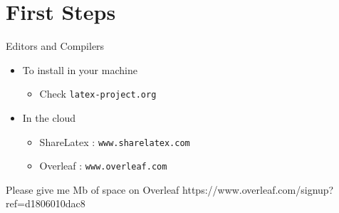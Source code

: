 






\section{First Steps}
	
\begin{frame}{Editors and Compilers}
\begin{itemize}
\item To install in your machine
\begin{itemize}
\item Check \texttt{latex-project.org}
\end{itemize}
\pause
\item In the cloud
\begin{itemize}
\item ShareLatex : \texttt{www.sharelatex.com}
\item Overleaf : \texttt{www.overleaf.com}
\end{itemize}
\end{itemize}
\pause
\vskip 1cm
\begin{block}{Please give me Mb of space on Overleaf}
https://www.overleaf.com/signup?ref=d1806010dac8
\end{block}
\end{frame}

